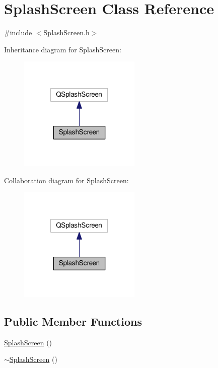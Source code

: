 \hypertarget{class_splash_screen}{\section{Splash\-Screen Class Reference}
\label{class_splash_screen}
}


{\ttfamily \#include $<$Splash\-Screen.\-h$>$}



Inheritance diagram for Splash\-Screen\-:\nopagebreak
\begin{figure}[H]
\begin{center}
\leavevmode
\includegraphics[width=164pt]{class_splash_screen__inherit__graph}
\end{center}
\end{figure}


Collaboration diagram for Splash\-Screen\-:\nopagebreak
\begin{figure}[H]
\begin{center}
\leavevmode
\includegraphics[width=164pt]{class_splash_screen__coll__graph}
\end{center}
\end{figure}
\subsection*{Public Member Functions}
\begin{DoxyCompactItemize}
\item 
\hyperlink{class_splash_screen_af7cda68255a26779cb49fd7a26d11492}{Splash\-Screen} ()
\item 
\hyperlink{class_splash_screen_aeb6a4736f6f7b9bb880d606610c2ae1e}{$\sim$\-Splash\-Screen} ()
\end{DoxyCompactItemize}
